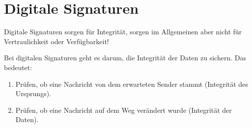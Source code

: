 \documentclass[a4paper, 11pt, accentcolor = tud3b]{tudreport}
\begin{document}
    \chapter{Digitale Signaturen}
	    Digitale Signaturen sorgen für Integrität, sorgen im Allgemeinen aber nicht für Vertraulichkeit oder Verfügbarkeit!
	    
	    Bei digitalen Signaturen geht es darum, die Integrität der Daten zu sichern. Das bedeutet:
	    \begin{enumerate}
	    	\item Prüfen, ob eine Nachricht von dem erwarteten Sender stammt (Integrität des Ursprungs).
	    	\item Prüfen, ob eine Nachricht auf dem Weg verändert wurde (Integrität der Daten).
	    \end{enumerate}
    
\end{document}
